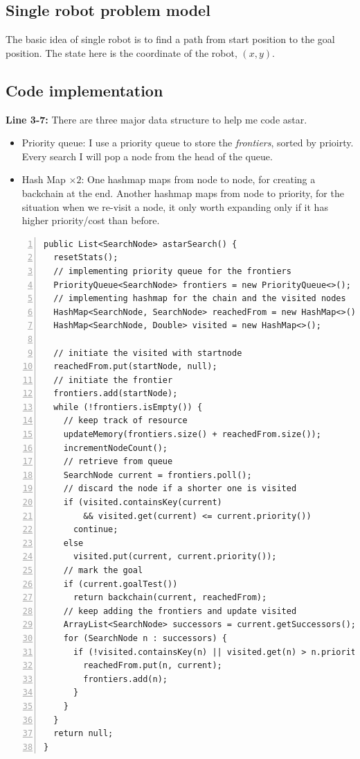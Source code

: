 \documentclass{article}
\begin{document}
\subsection{Single robot problem model}
The basic idea of single robot is to find a path from start position to the goal position. The state here is the coordinate of the robot, $(x,y)$.




\subsection{Code implementation}
\textbf{Line 3-7:} There are three major data structure to help me code astar.
\begin{itemize}
\item Priority queue: I use a priority queue to store the \emph{frontiers}, sorted by prioirty. Every search I will pop a node from the head of the queue.
\item Hash Map $\times 2$: One hashmap maps from node to node, for creating a backchain at the end. Another hashmap maps from node to priority, for the situation when we re-visit a node, it only worth expanding only if it has higher priority/cost than before.
\end{itemize}

\begin{lstlisting}[numbers=left]
public List<SearchNode> astarSearch() {
  resetStats();
  // implementing priority queue for the frontiers
  PriorityQueue<SearchNode> frontiers = new PriorityQueue<>();
  // implementing hashmap for the chain and the visited nodes
  HashMap<SearchNode, SearchNode> reachedFrom = new HashMap<>();
  HashMap<SearchNode, Double> visited = new HashMap<>();

  // initiate the visited with startnode
  reachedFrom.put(startNode, null);
  // initiate the frontier
  frontiers.add(startNode);
  while (!frontiers.isEmpty()) {
    // keep track of resource
    updateMemory(frontiers.size() + reachedFrom.size());
    incrementNodeCount();
    // retrieve from queue
    SearchNode current = frontiers.poll();
    // discard the node if a shorter one is visited
    if (visited.containsKey(current)
        && visited.get(current) <= current.priority())
      continue;
    else
      visited.put(current, current.priority());
    // mark the goal
    if (current.goalTest())
      return backchain(current, reachedFrom);
    // keep adding the frontiers and update visited
    ArrayList<SearchNode> successors = current.getSuccessors();
    for (SearchNode n : successors) {
      if (!visited.containsKey(n) || visited.get(n) > n.priority()) {
        reachedFrom.put(n, current);
        frontiers.add(n);
      }
    }
  }
  return null;
}
\end{lstlisting}
\end{document}
